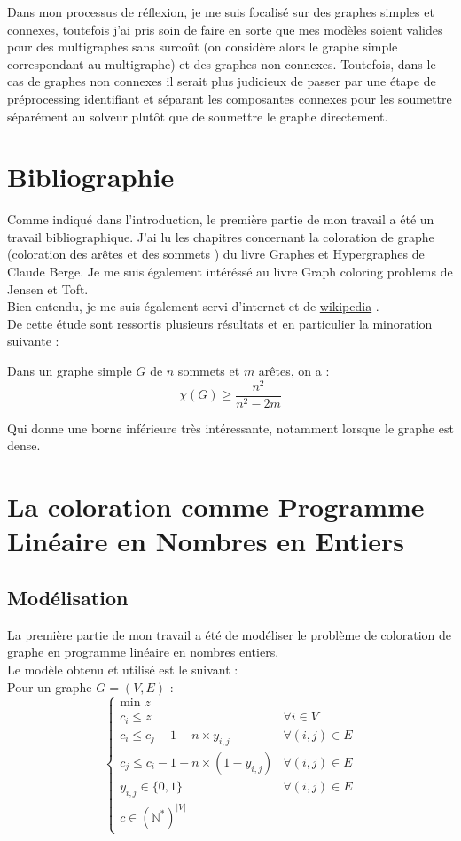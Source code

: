 Dans mon processus de réflexion, je me suis focalisé sur des graphes simples et connexes, toutefois
j'ai pris soin de faire en sorte que mes modèles soient valides pour des multigraphes sans surcoût
(on considère alors le graphe simple correspondant au multigraphe) et des graphes non connexes.
Toutefois, dans le cas de graphes non connexes il serait plus judicieux de passer par une étape
de préprocessing identifiant et séparant les composantes connexes pour les soumettre séparément
au solveur plutôt que de soumettre le graphe directement.

\section{Bibliographie}
Comme indiqué dans l'introduction, le première partie de mon travail a été un travail bibliographique.
J'ai lu les chapitres concernant la coloration de graphe (coloration des arêtes \cite{berge-arretes} et
des sommets \cite{berge-sommets}) du livre Graphes et Hypergraphes \cite{berge-graphes} de Claude Berge.
Je me suis également intéréssé au livre Graph coloring problems \cite{jensen1996graph} de Jensen et Toft.\\
Bien entendu, je me suis également servi d'internet et de \href{http://en.wikipedia.org/wiki/Main_Page}{wikipedia}
\cite{wiki}.\\

De cette étude sont ressortis plusieurs résultats et en particulier la minoration suivante :
\begin{theorem}
\label{minor}
Dans un graphe simple $G$ de $n$ sommets et $m$ arêtes, on a :
$$\chi(G) \geq \frac{n^2}{n^2-2m}$$
\end{theorem}
Qui donne une borne inférieure très intéressante, notamment lorsque le graphe est dense.

\section{La coloration comme Programme Linéaire en Nombres en Entiers}
\subsection{Modélisation}
La première partie de mon travail a été de modéliser le problème de coloration de graphe
en programme linéaire en nombres entiers.\\
Le modèle obtenu et utilisé est le suivant :\\
Pour un graphe $G=(V,E)$ :
\begin{equation}
\label{model-plne}
\left\{
    \begin{array}{ll}
        \text{min }z & \\
	c_i \leq z & \forall i \in V\\
        c_i \leq c_j - 1 + n\times y_{i,j}& \forall (i,j)\in E\\
        c_j \leq c_i - 1 + n\times (1-y_{i,j})& \forall (i,j)\in E\\
	y_{i,j} \in \{0,1\} & \forall (i,j)\in E\\
	c \in (\mathbb{N}^*)^{|V|}
    \end{array}
\right.
\end{equation}

